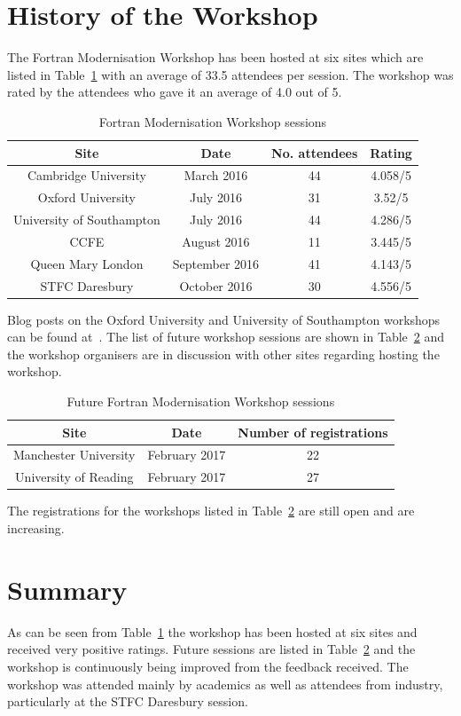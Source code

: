\documentclass[12pt]{article}
\begin{document}
\section{History of the Workshop}
The Fortran Modernisation Workshop has been hosted at six sites which are listed in Table~\ref{fmw:sites} with an
average of 33.5 attendees per session. The workshop was rated by the attendees who gave it an average of 4.0 out of 5.
\begin{table}[H]
\centering 
\begin{tabular}{|c|c|c|c|}
\hline
{\bf Site} & {\bf Date} & {\bf No. attendees} & {\bf Rating} \\ \hline
Cambridge University & March 2016 & 44 & 4.058/5 \\ \hline
Oxford University & July 2016 & 31 & 3.52/5 \\ \hline 
University of Southampton & July 2016 & 44 & 4.286/5 \\ \hline
CCFE & August 2016 & 11 & 3.445/5 \\ \hline
Queen Mary London & September 2016 & 41 & 4.143/5 \\ \hline
STFC Daresbury & October 2016 & 30 & 4.556/5 \\ \hline
\end{tabular}
\caption{Fortran Modernisation Workshop sessions}
\label{fmw:sites}
\end{table}
Blog posts on the Oxford University and University of Southampton workshops can be found at~\cite{jon:rsdn,lusher:soton}.
The list of future workshop sessions are shown in Table~\ref{fmw:future} and the workshop organisers are in
discussion with other sites regarding hosting the workshop. 
\begin{table}[H]
\centering 
\begin{tabular}{|c|c|c|}
\hline
{\bf Site} & {\bf Date} & {\bf Number of registrations} \\ \hline
Manchester University & February 2017 & 22 \\ \hline
University of Reading & February 2017 & 27 \\ \hline 
\end{tabular}
\caption{Future Fortran Modernisation Workshop sessions}
\label{fmw:future}
\end{table}
The registrations for the workshops listed in Table~\ref{fmw:future} are still open and are increasing. 
\section{Summary}
As can be seen from Table~\ref{fmw:sites} the workshop has been hosted at six sites and received very positive ratings.
Future sessions are listed in Table~\ref{fmw:future} and the workshop is continuously being improved from the feedback received.
The workshop was attended mainly by academics as well as attendees from industry, particularly at the STFC Daresbury session. \\
\end{document}
